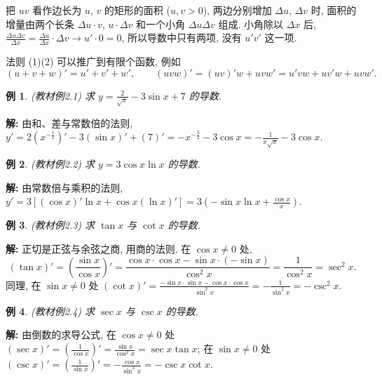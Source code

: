 \documentclass[UTF8,openany]{ctexbook}
\theoremstyle{chinesetextbook}
\newtheorem{example}{例}[section]
\newenvironment{cnsolution}{\par\indent\textbf{解:} \ignorespaces}{\par}
\begin{document}
把 $uv$ 看作边长为 $u$, $v$ 的矩形的面积 ($u,v>0$), 两边分别增加 $\Delta u$, $\Delta v$ 时, 面积的增量由两个长条 $\Delta u\cdot v$, $u\cdot\Delta v$ 和一个小角 $\Delta u\Delta v$ 组成. 小角除以 $\Delta x$ 后, $\displaystyle\frac{\Delta u\Delta v}{\Delta x}=\frac{\Delta u}{\Delta x}\cdot\Delta v\to u'\cdot0=0$, 所以导数中只有两项, 没有 $u'v'$ 这一项.

法则 (1)(2) 可以推广到有限个函数, 例如
\[
(u+v+w)'=u'+v'+w',\qquad(uvw)'=(uv)'w+uvw'=u'vw+uv'w+uvw'.
\]
\begin{example}\label{ex:c2-2-1}
\textnormal{(教材例2.1)} 求 $\displaystyle y=\frac2{\sqrt x}-3\sin x+7$ 的导数.
\end{example}
\begin{cnsolution}
由和、差与常数倍的法则, $\displaystyle y'=2\left(x^{-\frac12}\right)'-3(\sin x)'+(7)'=-x^{-\frac32}-3\cos x=-\frac1{x\sqrt x}-3\cos x$.
\end{cnsolution}
\begin{example}\label{ex:c2-2-2}
\textnormal{(教材例2.2)} 求 $y=3\cos x\ln x$ 的导数.
\end{example}
\begin{cnsolution}
由常数倍与乘积的法则, $\displaystyle y'=3\left[(\cos x)'\ln x+\cos x(\ln x)'\right]=3\left(-\sin x\ln x+\frac{\cos x}x\right)$.
\end{cnsolution}
\begin{example}\label{ex:c2-2-3}
\textnormal{(教材例2.3)} 求 $\tan x$ 与 $\cot x$ 的导数.
\end{example}
\begin{cnsolution}
正切是正弦与余弦之商, 用商的法则. 在 $\cos x\ne0$ 处,
\[
(\tan x)'=\left(\frac{\sin x}{\cos x}\right)'=\frac{\cos x\cdot\cos x-\sin x\cdot(-\sin x)}{\cos^2x}=\frac1{\cos^2x}=\sec^2x.
\]
同理, 在 $\sin x\ne0$ 处 $\displaystyle(\cot x)'=\frac{-\sin x\cdot\sin x-\cos x\cdot\cos x}{\sin^2x}=-\frac1{\sin^2x}=-\csc^2x$.
\end{cnsolution}
\begin{example}\label{ex:c2-2-4}
\textnormal{(教材例2.4)} 求 $\sec x$ 与 $\csc x$ 的导数.
\end{example}
\begin{cnsolution}
由倒数的求导公式, 在 $\cos x\ne0$ 处 $\displaystyle(\sec x)'=\left(\frac1{\cos x}\right)'=\frac{\sin x}{\cos^2x}=\sec x\tan x$; 在 $\sin x\ne0$ 处 $\displaystyle(\csc x)'=\left(\frac1{\sin x}\right)'=-\frac{\cos x}{\sin^2x}=-\csc x\cot x$.
\end{cnsolution}
\end{document}
